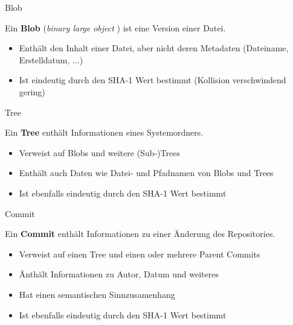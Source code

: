 \begin{frame}{Blob}
  \begin{Definition}
    Ein \textbf{Blob} (\glqq \textit{binary large object} \grqq ) ist eine Version einer Datei.
  \end{Definition}
  \begin{itemize}
    \pause
    \item Enthält den Inhalt einer Datei, aber nicht deren Metadaten (Dateiname, Erstelldatum, ...)
    \pause
    \item Ist eindeutig durch den SHA-1 Wert bestimmt (Kollision verschwindend gering)
  \end{itemize}

\end{frame}

\begin{frame}{Tree}
  \begin{Definition}
    Ein \textbf{Tree} enthält Informationen eines Systemordners.
  \end{Definition}
  \begin{itemize}
    \pause
    \item Verweist auf Blobs und weitere (Sub-)Trees
    \pause
    \item Enthält auch Daten wie Datei- und Pfadnamen von Blobs und Trees
    \pause
    \item Ist ebenfalls eindeutig durch den SHA-1 Wert bestimmt
  \end{itemize}

\end{frame}

\begin{frame}{Commit}
  \begin{Definition}
    Ein \textbf{Commit} enthält Informationen zu einer Änderung des Repositories.
  \end{Definition}
  \begin{itemize}
    \pause
    \item Verweist auf einen Tree und einen oder mehrere \glqq Parent\grqq{} Commits
    \pause
    \item Änthält Informationen zu Autor, Datum und weiteres
    \pause
    \item Hat einen semantischen Sinnzusamenhang
    \pause
    \item Ist ebenfalls eindeutig durch den SHA-1 Wert bestimmt
  \end{itemize}

\end{frame}

